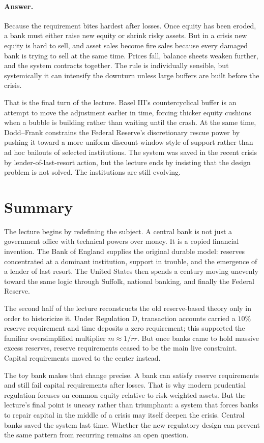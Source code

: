 \paragraph{Answer.} Because the requirement bites hardest after losses. Once equity has been eroded, a bank must either raise new equity or shrink risky assets. But in a crisis new equity is hard to sell, and asset sales become fire sales because every damaged bank is trying to sell at the same time. Prices fall, balance sheets weaken further, and the system contracts together. The rule is individually sensible, but systemically it can intensify the downturn unless large buffers are built before the crisis.

That is the final turn of the lecture. Basel III's countercyclical buffer is an attempt to move the adjustment earlier in time, forcing thicker equity cushions when a bubble is building rather than waiting until the crash. At the same time, Dodd--Frank constrains the Federal Reserve's discretionary rescue power by pushing it toward a more uniform discount-window style of support rather than ad hoc bailouts of selected institutions. The system was saved in the recent crisis by lender-of-last-resort action, but the lecture ends by insisting that the design problem is not solved. The institutions are still evolving.

\section{Summary}

The lecture begins by redefining the subject. A central bank is not just a government office with technical powers over money. It is a copied financial invention. The Bank of England supplies the original durable model: reserves concentrated at a dominant institution, support in trouble, and the emergence of a lender of last resort. The United States then spends a century moving unevenly toward the same logic through Suffolk, national banking, and finally the Federal Reserve.

The second half of the lecture reconstructs the old reserve-based theory only in order to historicize it. Under Regulation D, transaction accounts carried a \(10\%\) reserve requirement and time deposits a zero requirement; this supported the familiar oversimplified multiplier \(m \approx 1/rr\). But once banks came to hold massive excess reserves, reserve requirements ceased to be the main live constraint. Capital requirements moved to the center instead.

The toy bank makes that change precise. A bank can satisfy reserve requirements and still fail capital requirements after losses. That is why modern prudential regulation focuses on common equity relative to risk-weighted assets. But the lecture's final point is uneasy rather than triumphant: a system that forces banks to repair capital in the middle of a crisis may itself deepen the crisis. Central banks saved the system last time. Whether the new regulatory design can prevent the same pattern from recurring remains an open question.